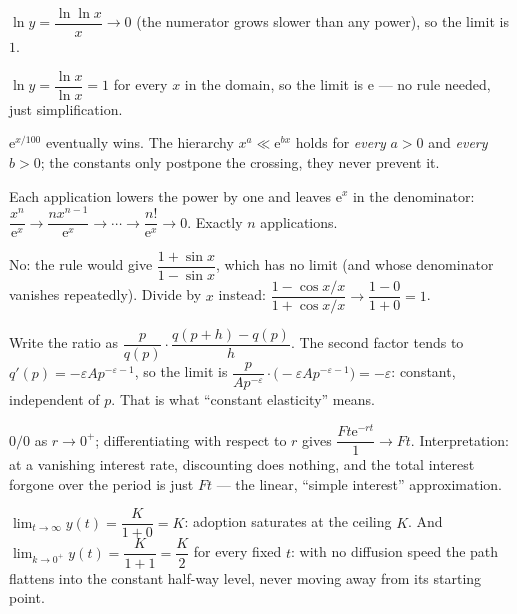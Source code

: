 \begin{solutions}
  \item $\ln y=\dfrac{\ln\ln x}{x}\to0$ (the numerator grows slower than
        any power), so the limit is $1$.
  \item $\ln y=\dfrac{\ln x}{\ln x}=1$ for every $x$ in the domain, so the
        limit is $\mathrm{e}$ --- no rule needed, just simplification.
  \item $\mathrm{e}^{x/100}$ eventually wins. The hierarchy
        $x^{a}\ll\mathrm{e}^{bx}$ holds for \emph{every} $a>0$ and
        \emph{every} $b>0$; the constants only postpone the crossing, they
        never prevent it.
  \item Each application lowers the power by one and leaves
        $\mathrm{e}^{x}$ in the denominator:
        $\dfrac{x^{n}}{\mathrm{e}^{x}}\to\dfrac{nx^{n-1}}{\mathrm{e}^{x}}
        \to\cdots\to\dfrac{n!}{\mathrm{e}^{x}}\to0$. Exactly $n$
        applications.
  \item No: the rule would give $\dfrac{1+\sin x}{1-\sin x}$, which has no
        limit (and whose denominator vanishes repeatedly). Divide by $x$
        instead: $\dfrac{1-\cos x/x}{1+\cos x/x}\to\dfrac{1-0}{1+0}=1$.
  \item Write the ratio as
        $\dfrac{p}{q(p)}\cdot\dfrac{q(p+h)-q(p)}{h}$. The second factor
        tends to $q'(p)=-\varepsilon Ap^{-\varepsilon-1}$, so the limit is
        $\dfrac{p}{Ap^{-\varepsilon}}\cdot
        \bigl(-\varepsilon Ap^{-\varepsilon-1}\bigr)=-\varepsilon$:
        constant, independent of $p$. That is what ``constant elasticity''
        means.
  \item $0/0$ as $r\to0^{+}$; differentiating with respect to $r$ gives
        $\dfrac{Ft\mathrm{e}^{-rt}}{1}\to Ft$. Interpretation: at a
        vanishing interest rate, discounting does nothing, and the total
        interest forgone over the period is just $Ft$ --- the linear,
        ``simple interest'' approximation.
  \item $\displaystyle\lim_{t\to\infty}y(t)=\dfrac{K}{1+0}=K$: adoption
        saturates at the ceiling $K$. And
        $\displaystyle\lim_{k\to0^{+}}y(t)=\dfrac{K}{1+1}=\dfrac{K}{2}$ for
        every fixed $t$: with no diffusion speed the path flattens into the
        constant half-way level, never moving away from its starting
        point.
\end{solutions}
